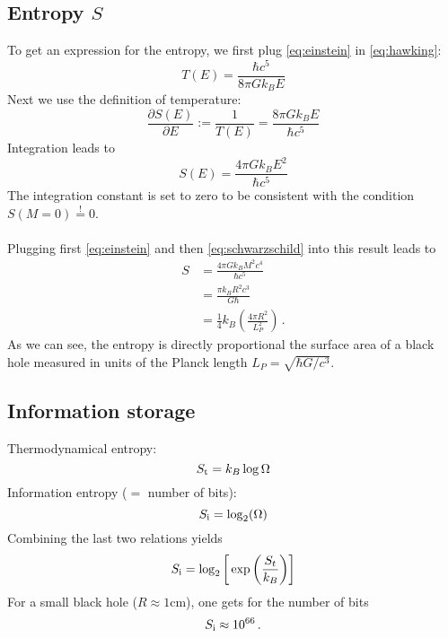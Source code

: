 \subsection{Entropy $S$}
    To get an expression for the entropy, we first plug 
    \eqref{eq:einstein} in \eqref{eq:hawking}:
    \begin{equation}
        T(E)=\frac{\hbar c^5}{8\pi Gk_BE}
    \end{equation}
    Next we use the definition of temperature:
    \begin{equation}
        \frac{\partial S(E)}{\partial E}:=\frac{1}{T(E)}
        =\frac{8\pi Gk_BE}{\hbar c^5}
    \end{equation}
    Integration leads to
    \begin{equation}
        S(E)=\frac{4\pi Gk_BE^2}{\hbar c^5}
    \end{equation}
    The integration constant is set to zero to be consistent with 
    the condition $S(M=0)\overset{!}{=}0$. \\
    \\
    Plugging first \eqref{eq:einstein} and then \eqref{eq:schwarzschild} 
    into this result leads to
    \begin{align}
        S
        &=\frac{4\pi Gk_BM^2c^4}{\hbar c^5} \\
        &=\frac{\pi k_BR^2c^3}{G\hbar} \\
        &=\frac{1}{4}k_B\left(\frac{4\pi R^2}{L_P^2}\right) \,.
    \end{align}
    As we can see, the entropy is directly proportional the surface area of a 
    black hole measured in units of the Planck length $L_P=\sqrt{\hbar G/c^3}$.

\subsection{Information storage}
    Thermodynamical entropy:
    \begin{equation}
        S_\textnormal{t}=k_B\log{\Omega}
        \label{}
    \end{equation}
    Information entropy ($=$ number of bits):
    \begin{equation}
        S_\textnormal{i}=\log_2(\Omega)
    \end{equation}
    Combining the last two relations yields
    \begin{equation}
        S_\textnormal{i}=\log_2\bigg[\exp\bigg(\frac{S_t}{k_B}\bigg)\bigg]
    \end{equation}
    For a small black hole ($R\approx 1$cm), one gets for the number of bits
    \begin{equation}
        S_\textnormal{i} \approx 10^{66} \,.
    \end{equation}

